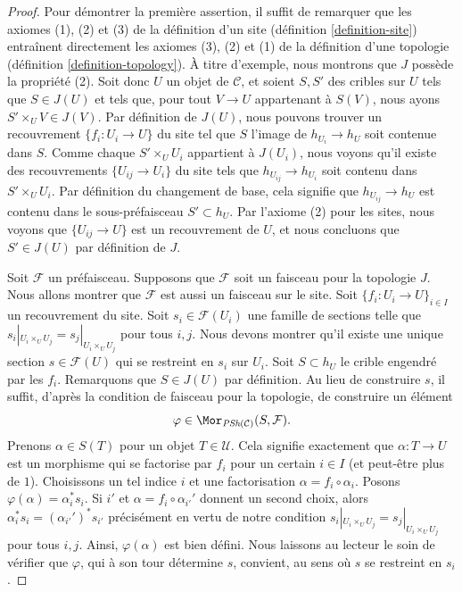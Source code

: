 \begin{proof}
Pour démontrer la première assertion, il suffit de remarquer que les axiomes
(1), (2) et (3) de la définition d'un site
(définition \ref{definition-site})
entraînent directement les axiomes
(3), (2) et (1) de la définition d'une topologie
(définition \ref{definition-topology}). À titre d'exemple, nous
montrons que $J$ possède la propriété (2). Soit donc $U$ un objet
de $\mathcal{C}$, et soient $S, S'$ des cribles sur $U$ tels que
$S \in J(U)$ et tels que, pour tout $V \to U$ appartenant à $S(V)$,
nous ayons $S' \times_U V \in J(V)$. Par définition de $J(U)$,
nous pouvons trouver un recouvrement $\{f_i : U_i \to U\}$ du site
tel que $S$ l'image de $h_{U_i} \to h_U$ soit contenue
dans $S$. Comme chaque $S'\times_U U_i$ appartient à $J(U_i)$, nous
voyons qu'il existe des recouvrements $\{U_{ij} \to U_i\}$ du
site tels que $h_{U_{ij}} \to h_{U_i}$ soit contenu
dans $S' \times_U U_i$. Par définition du changement de base,
cela signifie que $h_{U_{ij}} \to h_U$ est contenu
dans le sous-préfaisceau $S' \subset h_U$. Par l'axiome (2) pour les
sites, nous voyons que $\{U_{ij} \to U\}$ est un recouvrement de
$U$, et nous concluons que $S' \in J(U)$ par définition de $J$.

\medskip\noindent
Soit $\mathcal{F}$ un préfaisceau. Supposons que $\mathcal{F}$
soit un faisceau pour la topologie $J$. Nous allons montrer que $\mathcal{F}$
est aussi un faisceau sur le site. Soit $\{f_i : U_i \to U\}_{i\in I}$
un recouvrement du site. Soit $s_i \in \mathcal{F}(U_i)$ une
famille de sections telle que
$s_i|_{U_i \times_U U_j} = s_j|_{U_i \times_U U_j}$ pour tous
$i, j$. Nous devons montrer qu'il existe une unique section
$s \in \mathcal{F}(U)$ qui se restreint en $s_i$ sur $U_i$.
Soit $S \subset h_U$ le crible engendré par les $f_i$.
Remarquons que $S \in J(U)$ par définition. Au lieu de construire
$s$, il suffit, d'après la condition de faisceau pour la topologie,
de construire un élément
$$
\varphi \in \Mor_{\textit{PSh}(\mathcal{C})}(S, \mathcal{F}).
$$
Prenons $\alpha \in S(T)$ pour un objet $T \in \mathcal{U}$.
Cela signifie exactement que $\alpha : T \to U$ est un morphisme
qui se factorise par $f_i$ pour un certain $i\in I$ (et peut-être plus de $1$).
Choisissons un tel indice $i$ et une factorisation $\alpha = f_i \circ \alpha_i$.
Posons $\varphi(\alpha) = \alpha_i^* s_i$. Si $i'$ et $\alpha
= f_i \circ \alpha_{i'}'$ donnent un second choix, alors
$\alpha_i^* s_i = (\alpha_{i'}')^* s_{i'}$ précisément en vertu de notre
condition $s_i|_{U_i \times_U U_j} = s_j|_{U_i \times_U U_j}$ pour tous
$i, j$. Ainsi, $\varphi(\alpha)$ est bien défini. Nous laissons au lecteur
le soin de vérifier que $\varphi$, qui à son tour détermine $s$, convient,
au sens où $s$ se restreint en $s_i$.


\end{proof}
